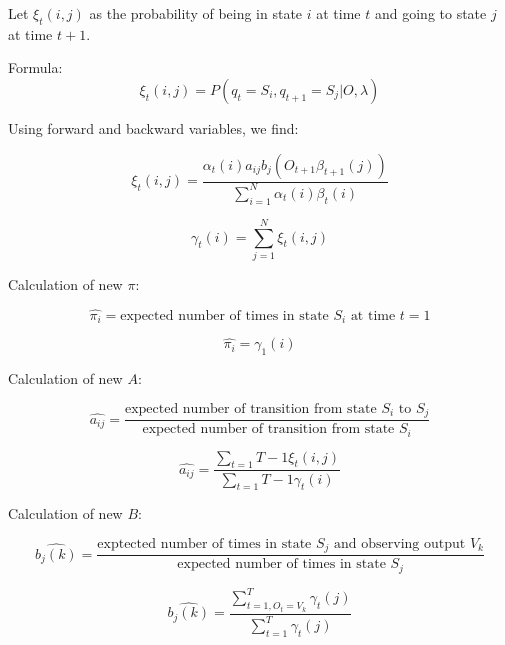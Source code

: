 Let $\xi_t(i,j)$ as the probability of being in state $i$ at time $t$ and going to state $j$ at time $t+1$.

Formula:
\begin{equation*}
    \xi_t(i,j) = P(q_t = S_i, q_{t+1} = S_j | O, \lambda)
\end{equation*}

Using forward and backward variables, we find:

\begin{equation*}
    \xi_t(i,j) = \frac{\alpha_t(i)a_{ij}b_j(O_{t+1}\beta_{t+1}(j))}{\sum_{i=1}^N \alpha_t(i) \beta_t(i)}
\end{equation*}

\begin{equation*}
    \gamma_t(i) = \sum_{j=1}^N \xi_t(i,j)
\end{equation*}

Calculation of new $\pi$:

\begin{equation*}
    \hat{\pi_i} = \text{expected number of times in state } S_i \text{ at time } t = 1
\end{equation*}

\begin{equation*}
    \hat{\pi_i} = \gamma_1(i)
\end{equation*}

Calculation of new $A$:

\begin{equation*}
    \hat{a_{ij}} = \frac{\text{expected number of transition from state $S_i$ to $S_j$}}{\text{expected number of transition from state $S_i$}}
\end{equation*}

\begin{equation*}
    \hat{a_{ij}} = \frac{\sum_{t=1}{T-1}\xi_t(i,j)}{\sum_{t=1}{T-1}\gamma_t(i)}
\end{equation*}

Calculation of new $B$:

\begin{equation*}
    \hat{b_{j}(k)} = \frac{\text{exptected number of times in state $S_j$ and observing output $V_k$}}{\text{expected number of times in state $S_j$}}
\end{equation*}

\begin{equation*}
    \hat{b_{j}(k)} = \frac{\sum_{t=1, O_t = V_k}^{T}\gamma_t(j)}{\sum_{t=1}^{T}\gamma_t(j)}
\end{equation*}

